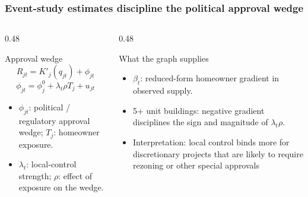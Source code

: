 \begin{frame}[t]
    \frametitle{Event-study estimates discipline the political approval wedge}
    \small

    \begin{columns}[T,totalwidth=\textwidth]
        \begin{column}{0.48\textwidth}
            \begin{block}{Approval wedge}
                \vspace{-0.8em}
                \[
                    R_{jt} = K'_j(q_{jt}) + \phi_{jt}
                \]
                \vspace{-1.0em}
                \[
                    \phi_{jt} =
                    \phi_j^0 + \lambda_t \rho T_j + u_{jt}
                \]
                \vspace{-1.1em}
                \scriptsize
                \begin{itemize}
                    \setlength\itemsep{0.15em}
                    \item \(\phi_{jt}\): political / regulatory approval wedge; \(T_j\): homeowner exposure.
                    \item \(\lambda_t\): local-control strength; \(\rho\): effect of exposure on the wedge.
                \end{itemize}
            \end{block}
        \end{column}
        \begin{column}{0.48\textwidth}
            \begin{block}{What the graph supplies}
                \scriptsize
                \begin{itemize}
                    \setlength\itemsep{0.25em}
                    \item \(\beta_t\): reduced-form homeowner gradient in observed supply.
                    \item 5+ unit buildings: negative gradient disciplines the sign and magnitude of \(\lambda_t\rho\).
                    \item Interpretation: local control binds more for discretionary projects that are likely to require rezoning or other special approvals
                \end{itemize}
            \end{block}
        \end{column}
    \end{columns}


\end{frame}
